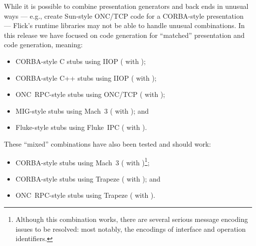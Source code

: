 While it is possible to combine presentation generators and back ends in
unusual ways --- e.g., create Sun-style ONC/TCP code for a CORBA-style
presentation --- Flick's runtime libraries may not be able to handle unusual
combinations.  In this release we have focused on code generation for
``matched'' presentation and code generation, meaning:

\begin{itemize}
  \item CORBA-style C stubs using IIOP ( with
  );

  \item CORBA-style C++ stubs using IIOP ( with
  );

  \item ONC~RPC-style stubs using ONC/TCP ( with
  );

  \item MIG-style stubs using Mach~3 ( with
  ); and

  \item Fluke-style stubs using Fluke~IPC ( with
  ).
\end{itemize}

These ``mixed'' combinations have also been tested and should work:

\begin{itemize}
  \item CORBA-style stubs using Mach~3 ( with
  )\footnote{Although this combination works,
  there are several serious message encoding issues to be resolved: most
  notably, the encodings of interface and operation identifiers.};

  \item CORBA-style stubs using Trapeze ( with
  ); and

  \item ONC~RPC-style stubs using Trapeze ( with
  ).
\end{itemize}




